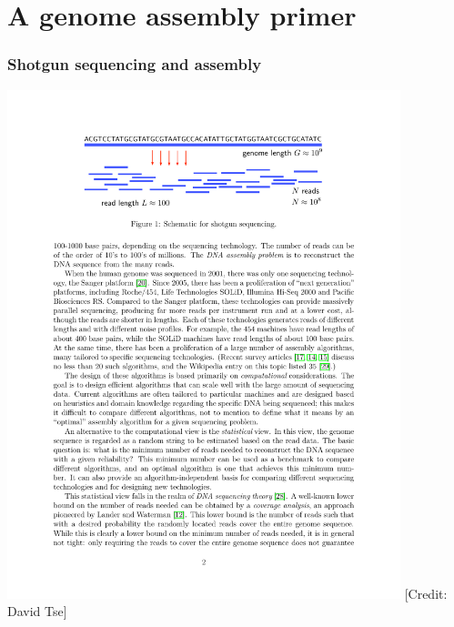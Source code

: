 \documentclass[serif,11pt]{beamer}
\begin{document}
\section{A genome assembly primer}
\label{sec-4}
\begin{frame}

   \sectionpage
\end{frame}
\begin{frame}
\frametitle{Shotgun sequencing and assembly}
\label{sec-4-1}

   \includegraphics[width=4.5in]{img/shotgun.pdf}
\newline \tiny [Credit: David Tse]
\end{frame}
\end{document}
